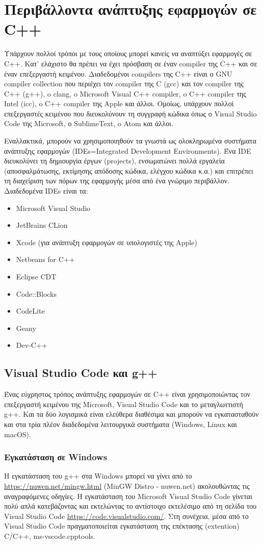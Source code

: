 \section*{Περιβάλλοντα ανάπτυξης εφαρμογών σε C++}
Υπάρχουν πολλοί τρόποι με τους οποίους μπορεί κανείς να αναπτύξει εφαρμογές σε C++. Κατ' ελάχιστο θα πρέπει να έχει πρόσβαση σε έναν compiler της C++ και σε έναν επεξεργαστή κειμένου. Διαδεδομένοι compilers της C++ είναι ο GNU compiler collection που περιέχει τον compiler της C (gcc) και τον compiler της C++ (g++), o clang, o Microsoft Visual C++ compiler, o C++ compiler της Intel (icc), o C++ compiler της Apple και άλλοι. Ομοίως, υπάρχουν πολλοί επεξεργαστές κειμένου που διευκολύνουν τη συγγραφή κώδικα όπως ο Visual Studio Code της Microsoft, ο SublimeText, o Atom και άλλοι.

Εναλλακτικά, μπορούν να χρησιμοποιηθούν τα γνωστά ως ολοκληρωμένα συστήματα ανάπτυξης εφαρμογών (IDEs=Integrated Development Environments). Ένα IDE διευκολύνει τη δημιουργία έργων (projects), ενσωματώνει πολλά εργαλεία (αποσφαλμάτωσης, εκτίμησης απόδοσης κώδικα, ελέγχου κώδικα κ.α.) και επιτρέπει τη διαχείριση των πόρων της εφαρμογής μέσα από ένα γνώριμο περιβάλλον. Διαδεδομένα IDEs είναι τα:
\begin{itemize}
\item Microsoft Visual Studio
\item JetBrains CLion
\item Xcode (για ανάπτυξη εφαρμογών σε υπολογιστές της Apple)
\item Netbeans for C++
\item Eclipse CDT
\item Code::Blocks
\item CodeLite
\item Geany 
\item Dev-C++
\end{itemize}  

\subsection*{Visual Studio Code και g++}
Ένας εύχρηστος τρόπος ανάπτυξης εφαρμογών σε C++ είναι χρησιμοποιώντας τον επεξεργαστή κειμένου της Microsoft, Visual Studio Code και το μεταγλωττιστή g++. Και τα δύο λογισμικά είναι ελεύθερα διαθέσιμα και μπορούν να εγκατασταθούν και στα τρία πλέον διαδεδομένα λειτουργικά συστήματα (Windows, Linux και macOS).   

\subsubsection*{Εγκατάσταση σε Windows}
Η εγκατάσταση του g++ στα Windows μπορεί να γίνει από το \href{https://nuwen.net/mingw.html}{https://nuwen.net/mingw.html} (MinGW Distro - nuwen.net) ακολουθώντας τις αναγραφόμενες οδηγίες. Η εγκατάσταση του Microsoft Visual Studio Code γίνεται πολύ απλά κατεβάζοντας και εκτελώντας το αντίστοιχο εκτελέσιμο από τη σελίδα του Visual Studio Code \href{https://code.visualstudio.com/}{https://code.visualstudio.com/}. Στη συνέχεια, μέσα από το Visual Studio Code πραγματοποιείται εγκατάσταση της επέκτασης (extention) C/C++, ms-vscode.cpptools.

